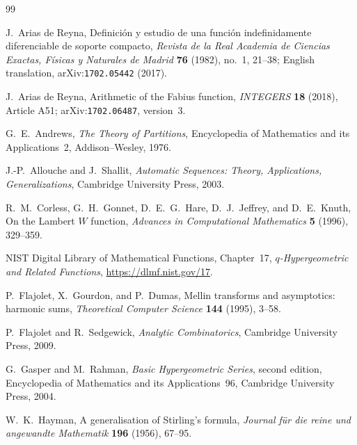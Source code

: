 \documentclass[11pt,oneside]{article}
\theoremstyle{definition}
\theoremstyle{remark}
\begin{document}
\renewcommand{\refname}{Topic references}
\begin{thebibliography}{99}

J.~Arias de Reyna,
\newblock Definici\'on y estudio de una funci\'on indefinidamente diferenciable de soporte
  compacto,
\newblock \emph{Revista de la Real Academia de Ciencias Exactas, F\'isicas y Naturales de
  Madrid} \textbf{76} (1982), no.~1, 21--38;
  English translation, arXiv:\nolinkurl{1702.05442} (2017).

J.~Arias de Reyna,
\newblock Arithmetic of the Fabius function,
\newblock \emph{INTEGERS} \textbf{18} (2018), Article A51;
  arXiv:\nolinkurl{1702.06487}, version~3.

G.~E.~Andrews,
\newblock \emph{The Theory of Partitions},
\newblock Encyclopedia of Mathematics and its Applications~2,
  Addison--Wesley, 1976.

J.-P.~Allouche and J.~Shallit,
\newblock \emph{Automatic Sequences: Theory, Applications, Generalizations},
\newblock Cambridge University Press, 2003.

R.~M.~Corless, G.~H.~Gonnet, D.~E.~G.~Hare, D.~J.~Jeffrey, and D.~E.~Knuth,
\newblock On the Lambert $W$ function,
\newblock \emph{Advances in Computational Mathematics} \textbf{5} (1996), 329--359.

NIST Digital Library of Mathematical Functions, Chapter~17,
\newblock \emph{$q$-Hypergeometric and Related Functions},
\newblock \url{https://dlmf.nist.gov/17}.

P.~Flajolet, X.~Gourdon, and P.~Dumas,
\newblock Mellin transforms and asymptotics: harmonic sums,
\newblock \emph{Theoretical Computer Science} \textbf{144} (1995), 3--58.

P.~Flajolet and R.~Sedgewick,
\newblock \emph{Analytic Combinatorics},
\newblock Cambridge University Press, 2009.

G.~Gasper and M.~Rahman,
\newblock \emph{Basic Hypergeometric Series}, second edition,
\newblock Encyclopedia of Mathematics and its Applications~96,
  Cambridge University Press, 2004.

W.~K.~Hayman,
\newblock A generalisation of Stirling's formula,
\newblock \emph{Journal f\"ur die reine und angewandte Mathematik}
  \textbf{196} (1956), 67--95.


\end{thebibliography}
\end{document}
